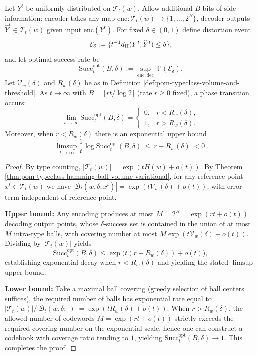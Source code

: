 \begin{theorem}\label{thm:pom-microcanonical-partial-inversion-threshold}
Let \(Y^t\) be uniformly distributed on \(\mathcal T_t(w)\).
Allow additional \(B\) bits of side information: encoder takes any map \(\mathrm{enc}:\mathcal T_t(w)\to\{1,\dots,2^B\}\),
decoder outputs \(\widehat Y^t\in\mathcal T_t(w)\) given input \(\mathrm{enc}(Y^t)\).
For fixed \(\delta\in(0,1)\) define distortion event
\[
\mathcal E_\delta:=\{t^{-1}d_{\rm H}(Y^t,\widehat Y^t)\le \delta\},
\]
and let optimal success rate be
\[
\mathrm{Succ}^{\mathrm{opt}}_t(B,\delta):=\sup_{\mathrm{enc},\mathrm{dec}}\ \mathbb P(\mathcal E_\delta).
\]
Let \(\mathcal V_w(\delta)\) and \(R_w(\delta)\) be as in Definition \ref{def:pom-typeclass-volume-and-threshold}.
As \(t\to\infty\) with \(B=\lfloor rt/\log 2\rfloor\) (rate \(r\ge 0\) fixed), a phase transition occurs:
\[
\boxed{\;
\lim_{t\to\infty}\mathrm{Succ}^{\mathrm{opt}}_t(B,\delta)=
\begin{cases}
0, & r<R_w(\delta),\\
1, & r>R_w(\delta).
\end{cases}\;}
\]
Moreover, when \(r<R_w(\delta)\) there is an exponential upper bound
\[
\boxed{\;
\limsup_{t\to\infty}\frac{1}{t}\log \mathrm{Succ}^{\mathrm{opt}}_t(B,\delta)\ \le\ r-R_w(\delta)\;<0\; }.
\]
\end{theorem}
\begin{proof}
By type counting, \(|\mathcal T_t(w)|=\exp(tH(w)+o(t))\).
By Theorem \ref{thm:pom-typeclass-hamming-ball-volume-variational}, for any reference point \(x^t\in\mathcal T_t(w)\) we have
\(|\mathcal B_t(w,\delta;x^t)|=\exp(t\mathcal V_w(\delta)+o(t))\), with error term independent of reference point.
\par
\textbf{Upper bound:}
Any encoding produces at most \(M=2^B=\exp(rt+o(t))\) decoding output points,
whose \(\delta\)-success set is contained in the union of at most \(M\) intra-type balls, with covering number at most
\(
M\exp(t\mathcal V_w(\delta)+o(t))
\).
Dividing by \(|\mathcal T_t(w)|\) yields
\[
\mathrm{Succ}^{\mathrm{opt}}_t(B,\delta)
\le
\exp\!\bigl(t(r-\!R_w(\delta))+o(t)\bigr),
\]
establishing exponential decay when \(r<R_w(\delta)\) and yielding the stated \(\limsup\) upper bound.
\par
\textbf{Lower bound:}
Take a maximal ball covering (greedy selection of ball centers suffices), the required number of balls has exponential rate equal to
\(|\mathcal T_t(w)|/|\mathcal B_t(w,\delta;\cdot)|=\exp(tR_w(\delta)+o(t))\).
When \(r>R_w(\delta)\), the allowed number of codewords \(M=\exp(rt+o(t))\) strictly exceeds the required covering number on the exponential scale,
hence one can construct a codebook with coverage ratio tending to \(1\), yielding \(\mathrm{Succ}^{\mathrm{opt}}_t(B,\delta)\to 1\).
This completes the proof.
\end{proof}


